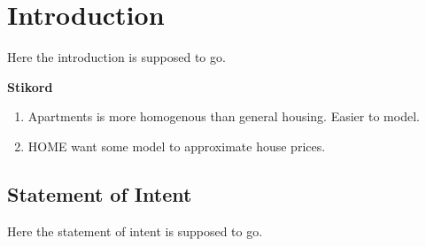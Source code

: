 \chapter{Introduction}\label{ch:introduction}
Here the introduction is supposed to go.

\textbf{Stikord}
\begin{enumerate}
    \item Apartments is more homogenous than general housing. Easier to model.
    \item HOME want some model to approximate house prices.
\end{enumerate}

\section{Statement of Intent}
Here the statement of intent is supposed to go.
